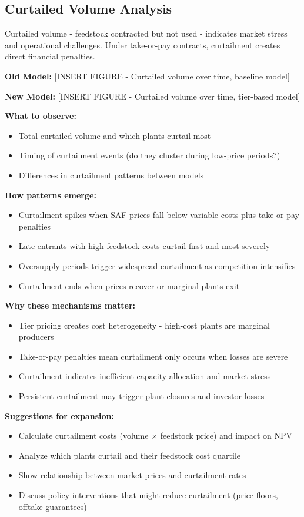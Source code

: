 \documentclass[10.5pt]{article}
\begin{document}
\subsection{Curtailed Volume Analysis}

Curtailed volume - feedstock contracted but not used - indicates market stress and operational challenges. Under take-or-pay contracts, curtailment creates direct financial penalties.

\textbf{Old Model:} [INSERT FIGURE - Curtailed volume over time, baseline model]

\textbf{New Model:} [INSERT FIGURE - Curtailed volume over time, tier-based model]

\textbf{What to observe:}
\begin{itemize}
    \item Total curtailed volume and which plants curtail most
    \item Timing of curtailment events (do they cluster during low-price periods?)
    \item Differences in curtailment patterns between models
\end{itemize}

\textbf{How patterns emerge:}
\begin{itemize}
    \item Curtailment spikes when SAF prices fall below variable costs plus take-or-pay penalties
    \item Late entrants with high feedstock costs curtail first and most severely
    \item Oversupply periods trigger widespread curtailment as competition intensifies
    \item Curtailment ends when prices recover or marginal plants exit
\end{itemize}

\textbf{Why these mechanisms matter:}
\begin{itemize}
    \item Tier pricing creates cost heterogeneity - high-cost plants are marginal producers
    \item Take-or-pay penalties mean curtailment only occurs when losses are severe
    \item Curtailment indicates inefficient capacity allocation and market stress
    \item Persistent curtailment may trigger plant closures and investor losses
\end{itemize}

\textbf{Suggestions for expansion:}
\begin{itemize}
    \item Calculate curtailment costs (volume × feedstock price) and impact on NPV
    \item Analyze which plants curtail and their feedstock cost quartile
    \item Show relationship between market prices and curtailment rates
    \item Discuss policy interventions that might reduce curtailment (price floors, offtake guarantees)
\end{itemize}
\end{document}
